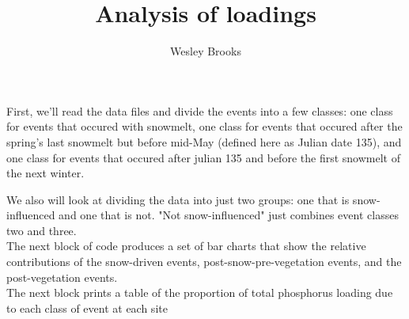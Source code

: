 \documentclass[12pt]{article}
\title{Analysis of loadings}
\author{Wesley Brooks}
\date{}                                           %
\begin{document}
\maketitle




First, we'll read the data files and divide the events into a few classes: one class for events that occured with snowmelt, one class for events that occured after the spring's last snowmelt but before mid-May (defined here as Julian date 135), and one class for events that occured after julian 135 and before the first snowmelt of the next winter. 

We also will look at dividing the data into just two groups: one that is snow-influenced and one that is not. "Not snow-influenced" just combines event classes two and three.\\











The next block of code produces a set of bar charts that show the relative contributions of the snow-driven events, post-snow-pre-vegetation events, and the post-vegetation events.\\











The next block prints a table of the proportion of total phosphorus loading due to each class of event at each site\\
\end{document}
